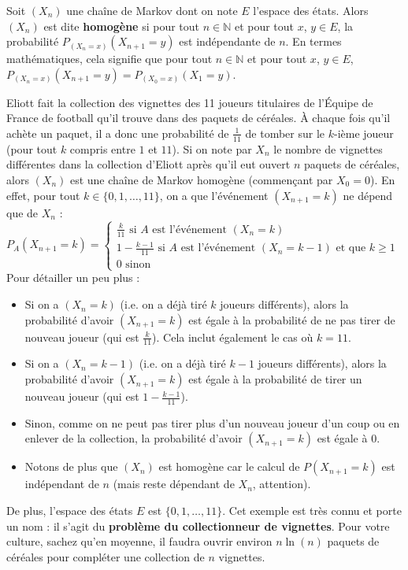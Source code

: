 	\begin{formula}
		Soit $(X_n)$ une chaîne de Markov dont on note $E$ l'espace des états. Alors $(X_n)$ est dite \textbf{homogène} si pour tout $n \in \mathbb{N}$ et pour tout $x$, $y \in E$, la probabilité $P_{(X_n = x)}(X_{n+1} = y)$ est indépendante de $n$.
		\newpar
		En termes mathématiques, cela signifie que pour tout $n \in \mathbb{N}$ et pour tout $x$, $y \in E$, $P_{(X_n = x)}(X_{n+1} = y) = P_{(X_0 = x)}(X_1 = y)$.
	\end{formula}

	\begin{tip}[Exemple]
		\contentwidth[big]
		Eliott fait la collection des vignettes des 11 joueurs titulaires de l'Équipe de France de football qu'il trouve dans des paquets de céréales. À chaque fois qu'il achète un paquet, il a donc une probabilité de $\frac{1}{11}$ de tomber sur le $k$-ième joueur (pour tout $k$ compris entre $1$ et $11$).
		\newpar
		Si on note par $X_n$ le nombre de vignettes différentes dans la collection d'Eliott après qu'il eut ouvert $n$ paquets de céréales, alors $(X_n)$ est une chaîne de Markov homogène (commençant par $X_0 = 0$). En effet, pour tout $k \in \{0, 1, \dots, 11\}$, on a que l'événement $(X_{n+1} = k)$ ne dépend que de $X_n$ :
		\newpar
		$\displaystyle{P_A(X_{n+1} = k) = \begin{cases}
				\frac{k}{11} \text{ si } A \text{ est l'événement } (X_n = k) \\
				1 - \frac{k-1}{11} \text{ si } A \text{ est l'événement } (X_n = k-1) \text{ et que } k \geq 1 \\
				0 \text{ sinon}
		\end{cases}}$
		\newpar
		Pour détailler un peu plus :
		\begin{itemize}
			\item Si on a $(X_n = k)$ (i.e. on a déjà tiré $k$ joueurs différents), alors la probabilité d'avoir $(X_{n+1} = k)$ est égale à la probabilité de ne pas tirer de nouveau joueur (qui est $\frac{k}{11}$). Cela inclut également le cas où $k = 11$.
			\item Si on a $(X_n = k-1)$ (i.e. on a déjà tiré $k-1$ joueurs différents), alors la probabilité d'avoir $(X_{n+1} = k)$ est égale à la probabilité de tirer un nouveau joueur (qui est $1 - \frac{k-1}{11}$).
			\item Sinon, comme on ne peut pas tirer plus d'un nouveau joueur d'un coup ou en enlever de la collection, la probabilité d'avoir $(X_{n+1} = k)$ est égale à $0$.
			\item Notons de plus que $(X_n)$ est homogène car le calcul de $P(X_{n+1} = k)$ est indépendant de $n$ (mais reste dépendant de $X_n$, attention).
		\end{itemize}
		De plus, l'espace des états $E$ est $\{0, 1, \dots, 11\}$.
		\newpar
		Cet exemple est très connu et porte un nom : il s'agit du \textbf{problème du collectionneur de vignettes}. Pour votre culture, sachez qu'en moyenne, il faudra ouvrir environ $n \ln(n)$ paquets de céréales pour compléter une collection de $n$ vignettes.
	\end{tip}

